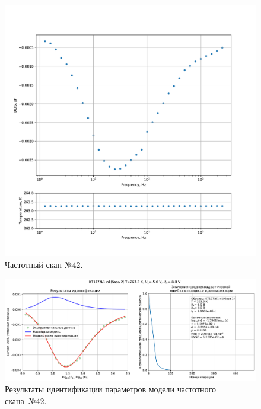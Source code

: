 \begin{figure}[!ht]
    \centering
    \includegraphics[width=1\textwidth]{../plots/КТ117№1_п1(база 2)_2500Гц-1Гц_1пФ_-10С_-5В-8В_100мВ_20мкс_шаг_0,1.pdf}
    \caption{Частотный скан №42.}
    \label{pic:frequency_scan_42}
\end{figure}

\begin{figure}[!ht]
    \centering
    \includegraphics[width=1\textwidth]{../plots/КТ117№1_п1(база 2)_2500Гц-1Гц_1пФ_-10С_-5В-8В_100мВ_20мкс_шаг_0,1_model.pdf}
    \caption{Результаты идентификации параметров модели частотного скана~№42.}
    \label{pic:frequency_scan_model42}
\end{figure}

\pagebreak


